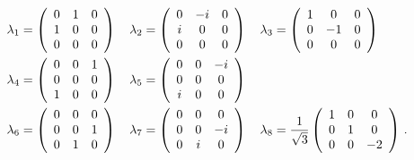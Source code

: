 \begin{align*}
\lambda _ { 1 } &= \left( \begin{array} { c c c } { 0 } & { 1 } & { 0 } \\ { 1 } & { 0 } & { 0 } \\ { 0 } & { 0 } & { 0 } \end{array} \right) \quad \lambda _ { 2 } = \left( \begin{array} { c c c } { 0 } & { - i } & { 0 } \\ { i } & { 0 } & { 0 } \\ { 0 } & { 0 } & { 0 } \end{array} \right) \quad \lambda _ { 3 } = \left( \begin{array} { c c c } { 1 } & { 0 } & { 0 } \\ { 0 } & { - 1 } & { 0 } \\ { 0 } & { 0 } & { 0 } \end{array} \right)\\
\lambda _ { 4 } &= \left( \begin{array} { c c c } { 0 } & { 0 } & { 1 } \\ { 0 } & { 0 } & { 0 } \\ { 1 } & { 0 } & { 0 } \end{array} \right) \quad \lambda _ { 5 } = \left( \begin{array} { c c c } { 0 } & { 0 } & { - i } \\ { 0 } & { 0 } & { 0 } \\ { i } & { 0 } & { 0 } \end{array} \right)\\
\lambda _ { 6 } &= \left( \begin{array} { c c c } { 0 } & { 0 } & { 0 } \\ { 0 } & { 0 } & { 1 } \\ { 0 } & { 1 } & { 0 } \end{array} \right) \quad \lambda _ { 7 } = \left( \begin{array} { c c c } { 0 } & { 0 } & { 0 } \\ { 0 } & { 0 } & { - i } \\ { 0 } & { i } & { 0 } \end{array} \right) \quad \lambda _ { 8 } = \frac { 1 } { \sqrt { 3 } } \left( \begin{array} { c c c } { 1 } & { 0 } & { 0 } \\ { 0 } & { 1 } & { 0 } \\ { 0 } & { 0 } & { - 2 } \end{array} \right)\, .
\end{align*}

